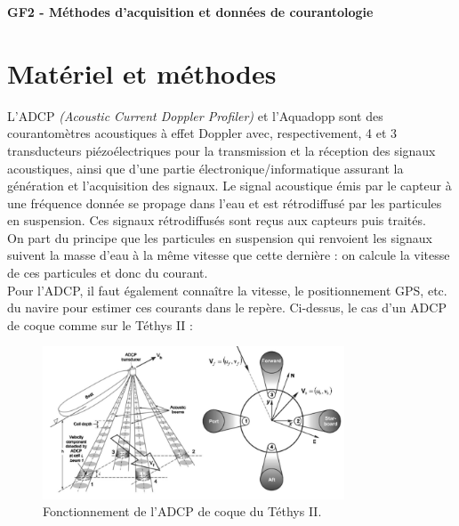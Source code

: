 \documentclass[12pt]{article}
\begin{document}
	
\thispagestyle{empty}
\begin{center}
\begin{LARGE}
\begin{center}
	\textbf{GF2 - Méthodes d’acquisition et données de courantologie}
\end{center}
\end{LARGE}
\end{center}

\section{Matériel et méthodes}
L'ADCP \textit{(Acoustic Current Doppler Profiler)} et l'Aquadopp sont des courantomètres acoustiques à effet Doppler avec, respectivement, 4 et 3 transducteurs piézoélectriques pour la transmission et la réception des signaux acoustiques, ainsi que d’une partie électronique/informatique assurant la génération et l’acquisition des signaux. Le signal acoustique émis par le capteur à une fréquence donnée se propage dans l’eau et est rétrodiffusé par les particules en suspension. Ces signaux rétrodiffusés sont reçus aux capteurs puis traités.\\
\indent On part du principe que les particules en suspension qui renvoient les signaux suivent la masse d’eau à la même vitesse que cette dernière : on calcule la vitesse de ces particules et donc du courant.\\
\indent Pour l'ADCP, il faut également connaître la vitesse, le positionnement GPS, etc. du navire pour estimer ces courants dans le repère. Ci-dessus, le cas d'un ADCP de coque comme sur le Téthys II :

\begin{figure}[!h]
	
	\begin{center}
		
		\includegraphics[width=0.8\textwidth]{adcp.png}
		
		\caption{Fonctionnement de l'ADCP de coque du Téthys II.}
		
	\end{center}
	
\end{figure}
\end{document}

